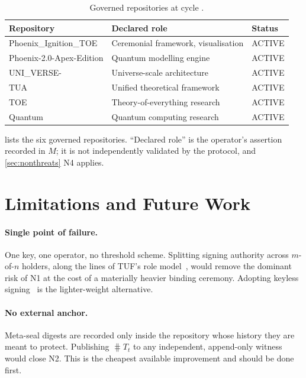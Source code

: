 \documentclass[11pt,a4paper]{article}
\begin{document}
\begin{table}[t]
\centering
\caption{Governed repositories at cycle \bindingcycle.}
\label{tab:repos}
\begin{tabular}{@{}lll@{}}
\toprule
\textbf{Repository} & \textbf{Declared role} & \textbf{Status} \\
\midrule
Phoenix\_Ignition\_TOE      & Ceremonial framework, visualisation & ACTIVE \\
Phoenix-2.0-Apex-Edition    & Quantum modelling engine            & ACTIVE \\
UNI\_VERSE-                 & Universe-scale architecture         & ACTIVE \\
TUA                         & Unified theoretical framework       & ACTIVE \\
TOE                         & Theory-of-everything research       & ACTIVE \\
Quantum                     & Quantum computing research          & ACTIVE \\
\bottomrule
\end{tabular}
\end{table}

 lists the six governed repositories. ``Declared role'' is
the operator's assertion recorded in $M$; it is not independently validated
by the protocol, and \cref{sec:nonthreats} N4 applies.

\section{Limitations and Future Work}
\label{sec:limitations}

\paragraph{Single point of failure.}
One key, one operator, no threshold scheme. Splitting signing authority
across $m$-of-$n$ holders, along the lines of TUF's role model~\cite{tuf2010},
would remove the dominant risk of N1 at the cost of a materially heavier
binding ceremony. Adopting keyless signing~\cite{sigstore2022} is the
lighter-weight alternative.

\paragraph{No external anchor.}
Meta-seal digests are recorded only inside the repository whose history they
are meant to protect. Publishing $\hash{T_t}$ to any independent, append-only
witness~\cite{rfc6962} would close N2. This is the cheapest available
improvement and should be done first.
\end{document}
